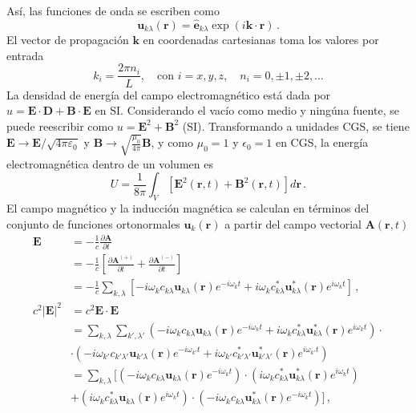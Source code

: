 Así, las funciones de onda se escriben como
\begin{equation}
\label{EM.15}
\mathbf{u}_{k\lambda}(\mathbf{r}) = \mathbf{\hat{e}}_{k\lambda} \exp\left({i\mathbf{k}\cdot \mathbf{r}}\right) \,.
\end{equation}
El vector de propagación $\mathbf{k}$ en coordenadas cartesianas toma los valores por entrada
\begin{equation}
\label{EM.16}
k_i = \frac{2\pi n_i}{L}, \quad \text{con } i=x,y,z , \quad n_i = 0, \pm1, \pm 2, \dots
\end{equation}
La densidad de energía del campo electromagnético está dada por $u = \mathbf{E} \cdot \mathbf{D} + \mathbf{B} \cdot \mathbf{E}$ en SI. Considerando el vacío como medio y ningúna fuente, se puede reescribir como $u = \mathbf{E}^2 + \mathbf{B}^2$ (SI). Transformando a unidades CGS, se tiene $\mathbf{E} \to \mathbf{E}/\sqrt{4\pi \varepsilon_0}$ y $\mathbf{B} \to \sqrt{\frac{\mu_0}{4\pi}}\mathbf{B}$, y como $\mu_0=1$ y $\epsilon_0 = 1$ en CGS, la energía electromagnética dentro de un volumen es
\begin{equation}
\label{EM.17}
U = \frac{1}{8\pi}\int_V \left[ \mathbf{E}^2(\mathbf{r}, t) + \mathbf{B}^2(\mathbf{r}, t) \right] d\mathbf{r} \,.
\end{equation}
El campo magnético y la inducción magnética se calculan en términos del conjunto de funciones ortonormales $\mathbf{u}_k(\mathbf{r})$ a partir del campo vectorial $\mathbf{A}(\mathbf{r}, t)$
\begin{align*}
\mathbf{E} & = -\frac{1}{c} \frac{\partial \mathbf{A}}{\partial t} \\
& =-\frac{1}{c}\left[ \frac{\partial \mathbf{A}^{(+)}}{\partial t} + \frac{\partial \mathbf{A}^{(-)}}{\partial t} \right] \\
& = -\frac{1}{c} \sum_{k,\lambda} \left[ -i\omega_{k}c_{k\lambda} \mathbf{u}_{k\lambda} (\mathbf{r})e^{-i\omega_k t} +  i\omega_{k}c_{k\lambda}^* \mathbf{u}_{k\lambda}^* (\mathbf{r})e^{i\omega_{k} t} \right] \,, \\
c^2 \vert\mathbf{E}\vert^2 & = c^2 \mathbf{E} \cdot \mathbf{E} \\
&= \sum_{k,\lambda}\sum_{k',\lambda'}\left(-i\omega_{k}c_{k\lambda}\mathbf{u}_{k\lambda} (\mathbf{r})e^{-i\omega_{k}t} + i \omega_{k} c^{*}_{k\lambda}\mathbf{u}^{*}_{k\lambda}(\mathbf{r})e^{i\omega_{k}t} \right)\cdot \\
&\cdot \left(-i\omega_{k'}c_{k'\lambda'}\mathbf{u}_{k'\lambda} (\mathbf{r})e^{-i\omega_{k'}t} + i \omega_{k'} c^{*}_{k'\lambda'}\mathbf{u}^{*}_{k'\lambda'}(\mathbf{r})e^{i\omega_{k'}t} \right)\\
& = \sum_{k,\lambda} \Big[ \left(-i\omega_{k}c_{k\lambda} \mathbf{u}_{k\lambda} (\mathbf{r})e^{-i\omega_k t}\right)\cdot \left( i\omega_{k}c_{k\lambda}^* \mathbf{u}_{k\lambda}^* (\mathbf{r})e^{i\omega_{k} t} \right) \\
& +  \left(i\omega_{k}c_{k\lambda}^* \mathbf{u}_{k\lambda} (\mathbf{r})e^{i\omega_{k} t}\right)\cdot \left(-i\omega_{k}c_{k\lambda} \mathbf{u}_{k\lambda}^* (\mathbf{r})e^{-i\omega_k t}\right) \Big]\,,                   \\
\end{align*}
